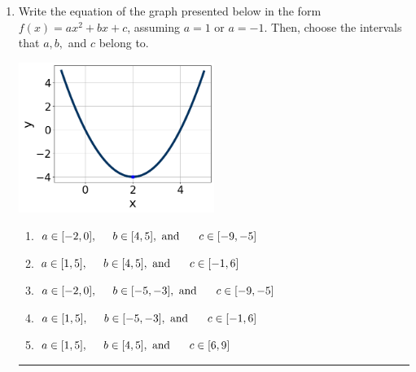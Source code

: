\documentclass[14pt]{extbook}
\newcommand{\litem}[1]{\item#1\hspace*{-1cm}\rule{\textwidth}{0.4pt}}
\begin{document}
\begin{enumerate}
{\begin{enumerate}[label=\Alph*.]
\end{enumerate} }
\litem{
Write the equation of the graph presented below in the form $f(x)=ax^2+bx+c$, assuming  $a=1$ or $a=-1$. Then, choose the intervals that $a, b,$ and $c$ belong to.
\begin{center}
    \includegraphics[width=0.5\textwidth]{../Figures/quadraticGraphToEquationB.png}
\end{center}
\begin{enumerate}[label=\Alph*.]
\item \( a \in [-2, 0], \hspace*{5mm} b \in [4, 5], \text{ and } \hspace*{5mm} c \in [-9, -5] \)
\item \( a \in [1, 5], \hspace*{5mm} b \in [4, 5], \text{ and } \hspace*{5mm} c \in [-1, 6] \)
\item \( a \in [-2, 0], \hspace*{5mm} b \in [-5, -3], \text{ and } \hspace*{5mm} c \in [-9, -5] \)
\item \( a \in [1, 5], \hspace*{5mm} b \in [-5, -3], \text{ and } \hspace*{5mm} c \in [-1, 6] \)
\item \( a \in [1, 5], \hspace*{5mm} b \in [4, 5], \text{ and } \hspace*{5mm} c \in [6, 9] \)


\end{enumerate}}
\end{enumerate}
\end{document}
